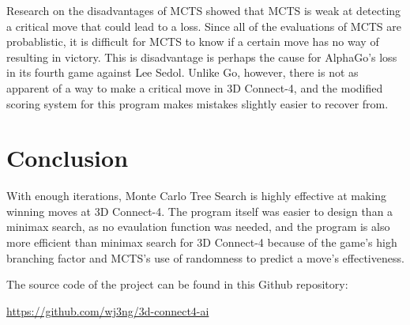 \documentclass[12pt, a4paper]{article}
\begin{document}
    Research on the disadvantages of MCTS showed that MCTS is weak at detecting a critical move that could lead to a loss. Since all of the evaluations of MCTS are probablistic, it is difficult for MCTS to know if a certain move has no way of resulting in victory. This is disadvantage is perhaps the cause for AlphaGo's loss in its fourth game against Lee Sedol. Unlike Go, however, there is not as apparent of a way to make a critical move in 3D Connect-4, and the modified scoring system for this program makes mistakes slightly easier to recover from. 

    \section{Conclusion}

    With enough iterations, Monte Carlo Tree Search is highly effective at making winning moves at 3D Connect-4. The program itself was easier to design than a minimax search, as no evaulation function was needed, and the program is also more efficient than minimax search for 3D Connect-4 because of the game's high branching factor and MCTS's use of randomness to predict a move's effectiveness.


    The source code of the project can be found in this Github repository: 

    \url{https://github.com/wj3ng/3d-connect4-ai}
\end{document}
